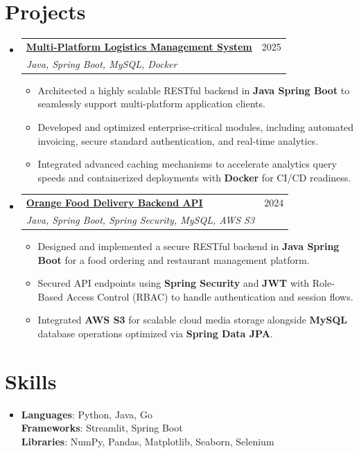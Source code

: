 \documentclass[a4paper,11pt]{article}
\makeatletter
\newcommand{\resumeItem}[1]{
  \item\small{
    {#1 \vspace{-3pt}}
  }
}
\newcommand{\resumeSubheading}[4]{
  \vspace{-3pt}\item
    \begin{tabular*}{\textwidth}[t]{l@{\extracolsep{\fill}}r}
      \textbf{#1} & #2 \\
      \textit{\small#3} & \textit{\small #4} \\
    \end{tabular*}\vspace{-8pt}
}
\newcommand{\resumeSubHeadingListStart}{\begin{itemize}[leftmargin=0.12in, label={}, itemsep=0pt]}
\newcommand{\resumeSubHeadingListEnd}{\end{itemize}}
\newcommand{\resumeItemListStart}{\begin{itemize}[leftmargin=0.18in, itemsep=0pt]}
\newcommand{\resumeItemListEnd}{\end{itemize}\vspace{-6pt}}
\makeatother
\begin{document}
\section{Projects}
  \resumeSubHeadingListStart
    \resumeSubheading
      {\href{https://github.com/datblue21/Multi-platform-logistics-management}{Multi-Platform Logistics Management System}}{2025}
      {Java, Spring Boot, MySQL, Docker}{}
      \resumeItemListStart
        \resumeItem{Architected a highly scalable RESTful backend in \textbf{Java Spring Boot} to seamlessly support multi-platform application clients.}
        \resumeItem{Developed and optimized enterprise-critical modules, including automated invoicing, secure standard authentication, and real-time analytics.}
        \resumeItem{Integrated advanced caching mechanisms to accelerate analytics query speeds and containerized deployments with \textbf{Docker} for CI/CD readiness.}
      \resumeItemListEnd
    \resumeSubheading
      {\href{https://github.com/datblue21/Orange-Food}{Orange Food Delivery Backend API}}{2024}
      {Java, Spring Boot, Spring Security, MySQL, AWS S3}{}
      \resumeItemListStart
        \resumeItem{Designed and implemented a secure RESTful backend in \textbf{Java Spring Boot} for a food ordering and restaurant management platform.}
        \resumeItem{Secured API endpoints using \textbf{Spring Security} and \textbf{JWT} with Role-Based Access Control (RBAC) to handle authentication and session flows.}
        \resumeItem{Integrated \textbf{AWS S3} for scalable cloud media storage alongside \textbf{MySQL} database operations optimized via \textbf{Spring Data JPA}.}
      \resumeItemListEnd
  \resumeSubHeadingListEnd

\section{Skills}
 \begin{itemize}[leftmargin=0.12in, label={}, itemsep=0pt]
    \item  
     \textbf{Languages}: Python, Java, Go \\
     \textbf{Frameworks}: Streamlit, Spring Boot \\
     \textbf{Libraries}: NumPy, Pandas, Matplotlib, Seaborn, Selenium \\
 \end{itemize}
\end{document}
